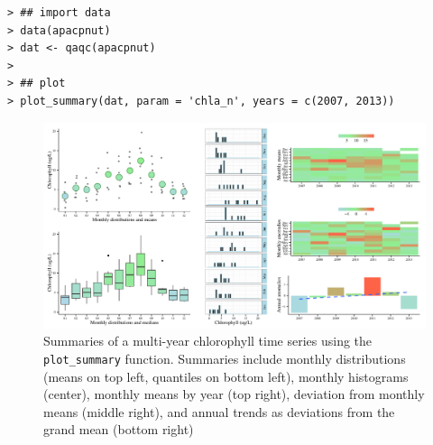 \documentclass[10pt,letterpaper]{article}\usepackage[]{graphicx}\usepackage[]{color}
\makeatletter
\def\maxwidth{ %
  \ifdim\Gin@nat@width>\linewidth
    \linewidth
  \else
    \Gin@nat@width
  \fi
}
\newenvironment{kframe}{%
 \def\at@end@of@kframe{}%
 \ifinner\ifhmode%
  \def\at@end@of@kframe{\end{minipage}}%
  \begin{minipage}{\columnwidth}%
 \fi\fi%
 \def\FrameCommand##1{\hskip\@totalleftmargin \hskip-\fboxsep
 \colorbox{shadecolor}{##1}\hskip-\fboxsep
     \hskip-\linewidth \hskip-\@totalleftmargin \hskip\columnwidth}%
 \MakeFramed {\advance\hsize-\width
   \@totalleftmargin\z@ \linewidth\hsize
   \@setminipage}}%
 {\par\unskip\endMakeFramed%
 \at@end@of@kframe}
\newenvironment{knitrout}{}{} %
\makeatother
\begin{document}
\begin{knitrout}\small
{}\color{fgcolor}\begin{kframe}
\begin{verbatim}
> ## import data
> data(apacpnut)
> dat <- qaqc(apacpnut)
> 
> ## plot
> plot_summary(dat, param = 'chla_n', years = c(2007, 2013))
\end{verbatim}
\end{kframe}\begin{figure}[!ht]


{\centering \includegraphics[width=\maxwidth]{figure/summary_ex} 

}

\caption[Summaries of a multi-year chlorophyll time series using the \texttt{plot\_summary} function]{Summaries of a multi-year chlorophyll time series using the \texttt{plot\_summary} function.  Summaries include monthly distributions (means on top left, quantiles on bottom left), monthly histograms (center), monthly means by year (top right), deviation from monthly means (middle right), and annual trends as deviations from the grand mean (bottom right)\label{fig:summary_ex}}
\end{figure}


\end{knitrout}
\end{document}

